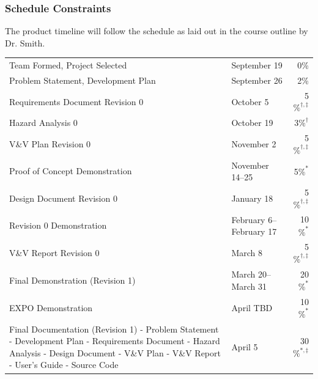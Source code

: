 \documentclass[12pt]{article}
\begin{document}
\subsubsection{Schedule Constraints}
The product timeline will follow the schedule as laid out in the course outline by Dr. Smith. \\
\newline
\begin{tabular}{ p{9.7cm} l r}
	
	Team Formed, Project Selected & September 19 & 0\% \\
	
	Problem Statement, Development Plan & September 26 &
	2\% \\
	
	Requirements Document Revision 0 & October 5 & 5$\%^{\dagger, \ddagger}$ \\
	
	Hazard Analysis 0 & October 19 & 3$\%^\dagger$ \\
	
	V\&V Plan Revision 0 & November 2 & 5$\%^{\dagger, \ddagger}$ \\
	
	Proof of Concept Demonstration & November 14--25 & 5$\%^*$ \\
	
	Design Document Revision 0 & January 18 & 5$\%^{\dagger, \ddagger}$ \\
	
	Revision 0 Demonstration & February 6--February 17 & 10$\%^*$\\
	
	V\&V Report Revision 0 & March 8 & 5$\%^{\dagger, \ddagger}$ \\
	
	Final Demonstration (Revision 1) & March 20--March 31 &  20$\%^*$ \\
	
	EXPO Demonstration & April TBD & 10$\%^*$ \\
	
	Final Documentation (Revision 1)\newline 
	- Problem Statement\newline
	- Development Plan\newline
	- Requirements Document\newline
	- Hazard Analysis\newline
	- Design Document\newline
	- V\&V Plan\newline
	- V\&V Report\newline
	- User's Guide\newline
	- Source Code\newline &  April 5 & 30$\%^{*, \ddagger}$\\
	
\end{tabular}
\end{document}
